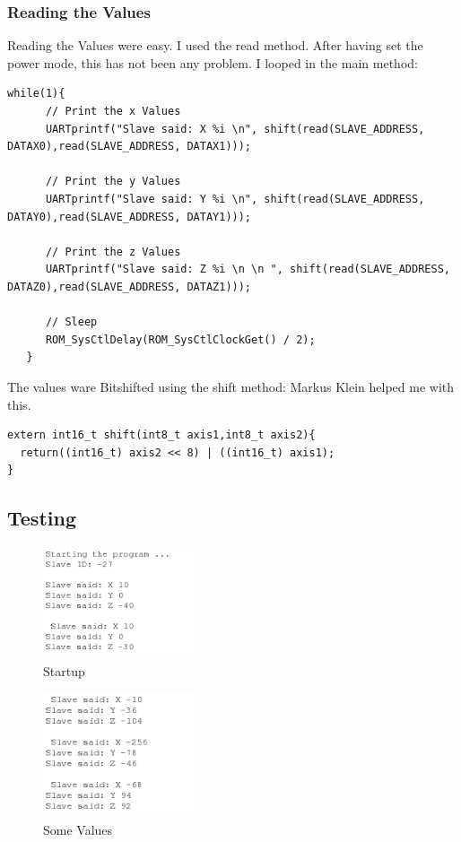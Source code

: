 \documentclass[12pt]{article}
\begin{document}
\subsubsection{Reading the Values}
Reading the Values were easy. I used the read method. After having set the power mode, this has not been any problem. I looped in the main method:
\begin{lstlisting} 
while(1){
      // Print the x Values
      UARTprintf("Slave said: X %i \n", shift(read(SLAVE_ADDRESS, DATAX0),read(SLAVE_ADDRESS, DATAX1)));

      // Print the y Values
      UARTprintf("Slave said: Y %i \n", shift(read(SLAVE_ADDRESS, DATAY0),read(SLAVE_ADDRESS, DATAY1)));

      // Print the z Values
      UARTprintf("Slave said: Z %i \n \n ", shift(read(SLAVE_ADDRESS, DATAZ0),read(SLAVE_ADDRESS, DATAZ1)));

      // Sleep
      ROM_SysCtlDelay(ROM_SysCtlClockGet() / 2);
   }
\end{lstlisting} 
The values ware Bitshifted using the shift method:
Markus Klein helped me with this.
\begin{lstlisting} 
extern int16_t shift(int8_t axis1,int8_t axis2){
  return((int16_t) axis2 << 8) | ((int16_t) axis1);
}
\end{lstlisting} 
\newpage
\subsection{Testing}
\begin{figure}[here!]
\centering
    \includegraphics[width=0.4\textwidth]{images/sc1}
    \caption{Startup}
    \label{fig:i2clayout}
\end{figure}

\begin{figure}[here!]
\centering
    \includegraphics[width=0.4\textwidth]{images/sc2}
    \caption{Some Values}
    \label{fig:i2clayout}
\end{figure}
\end{document}
